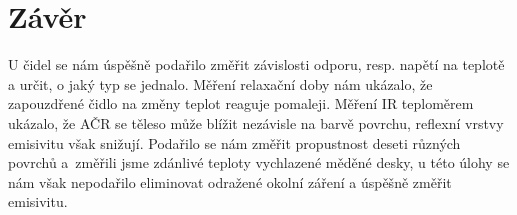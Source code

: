 \documentclass[czech,11pt,a4paper]{article}
\begin{document}
	
	\section{Závěr}
	U čidel se nám úspěšně podařilo změřit závislosti odporu, resp. napětí na teplotě a určit, o jaký typ se jednalo. Měření relaxační doby nám ukázalo, že zapouzdřené čidlo na změny teplot reaguje pomaleji. Měření IR teploměrem ukázalo, že AČR se těleso může blížit nezávisle na barvě povrchu, reflexní vrstvy emisivitu však snižují. Podařilo se nám změřit propustnost deseti různých povrchů a~změřili jsme zdánlivé teploty vychlazené měděné desky, u této úlohy se nám však nepodařilo eliminovat odražené okolní záření a úspěšně změřit emisivitu.

	
	
	
\end{document}
